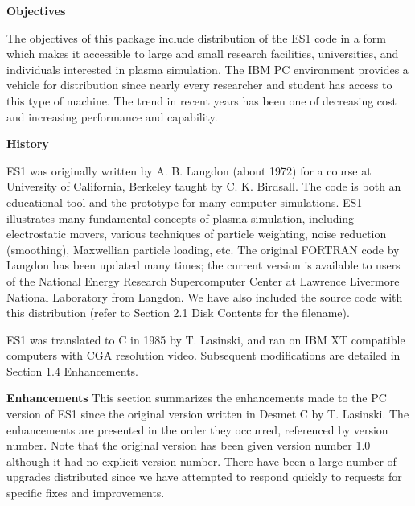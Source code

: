 \begin{section}
\begin{subsection}
{\bf Objectives}

   The objectives of this package include distribution of the ES1 code in a
   form which makes it accessible to large and small research facilities,
   universities, and individuals interested in plasma simulation.  The IBM PC
   environment provides a vehicle for distribution since nearly every
   researcher and student has access to this type of machine.  The trend in
   recent years has been one of decreasing cost and increasing performance and
   capability.
\end{subsection}

\begin{subsection}
{\bf History}

   ES1 was originally written by A. B. Langdon (about 1972) for a course at University of
   California, Berkeley taught by C. K. Birdsall.  The code is both an
   educational tool and the prototype for many computer simulations.  ES1
   illustrates many fundamental concepts of plasma simulation, including
   electrostatic movers, various techniques of particle weighting, noise
   reduction (smoothing), Maxwellian particle loading, etc.  The original
   FORTRAN code by Langdon has been updated many times; the current version is
   available to users of the National Energy Research Supercomputer Center at
   Lawrence Livermore National Laboratory from Langdon.  We have also included
   the source code with this distribution (refer to Section 2.1 Disk Contents
   for the filename).
\vspace{.2in}

\noindent
   ES1 was translated to C in 1985 by T. Lasinski, and ran on IBM XT compatible
   computers with CGA resolution video.  Subsequent modifications are detailed
   in Section 1.4 Enhancements.
\end{subsection}

\begin{subsection}
{\bf Enhancements}
   This section summarizes the enhancements made to the PC version of ES1 since
   the original version written in Desmet C by T. Lasinski.  The enhancements
   are presented in the order they occurred, referenced by version number.
   Note that the original version has been given version number 1.0 although it
   had no explicit version number.  There have been a large number of upgrades
   distributed since we have attempted to respond quickly to requests for
   specific fixes and improvements.


\end{subsection}
\end{section}
